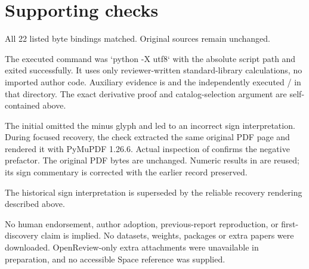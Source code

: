 \documentclass[10pt]{article}
\begin{document}
\section*{Supporting checks}
All 22 listed byte bindings matched. Original sources remain unchanged.\par
The executed command was `python -X utf8` with the absolute script path and exited successfully. It uses only reviewer-written standard-library calculations, no imported author code. Auxiliary evidence is and the independently executed / in that directory. The exact derivative proof and catalog-selection argument are self-contained above.\par
The initial omitted the minus glyph and led to an incorrect sign interpretation. During focused recovery, the check extracted the same original PDF page and rendered it with PyMuPDF 1.26.6. Actual inspection of confirms the negative prefactor. The original PDF bytes are unchanged. Numeric results in are reused; its sign commentary is corrected with the earlier record preserved.\par
The historical sign interpretation is superseded by the reliable recovery rendering described above.\par
No human endorsement, author adoption, previous-report reproduction, or first-discovery claim is implied. No datasets, weights, packages or extra papers were downloaded. OpenReview-only extra attachments were unavailable in preparation, and no accessible Space reference was supplied.\par
\end{document}
